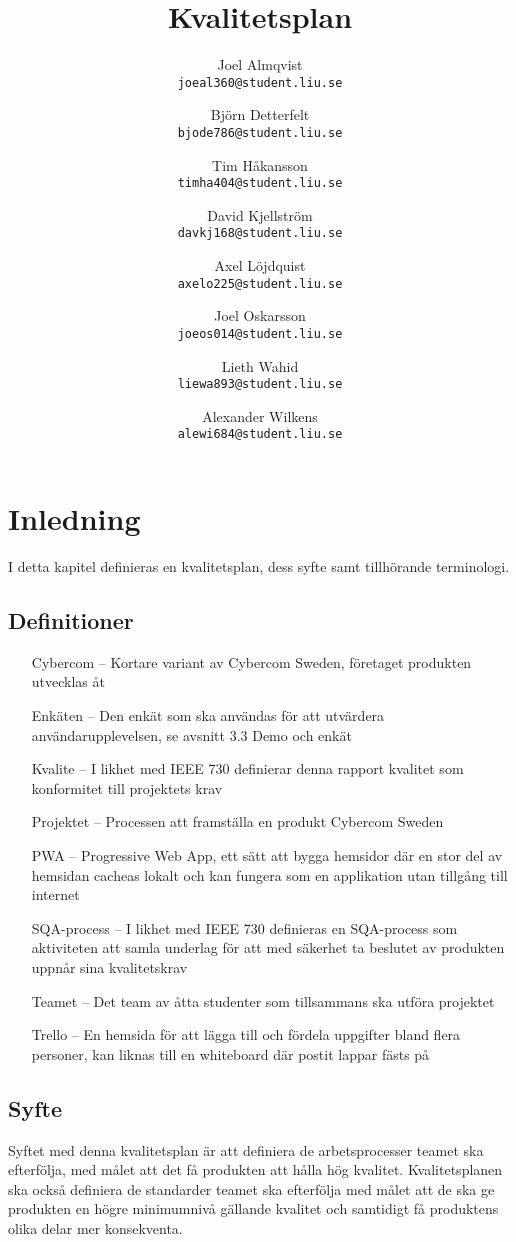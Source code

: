 \documentclass[10pt]{article}
\title{Kvalitetsplan}
\author{
    Joel Almqvist\\
    \texttt{joeal360@student.liu.se}
    \and
    Björn Detterfelt\\
    \texttt{bjode786@student.liu.se}
    \and
    Tim Håkansson\\
    \texttt{timha404@student.liu.se}
    \and
    David Kjellström\\
    \texttt{davkj168@student.liu.se}
    \and
    Axel Löjdquist\\
    \texttt{axelo225@student.liu.se}
    \and
    Joel Oskarsson\\
    \texttt{joeos014@student.liu.se}
    \and
    Lieth Wahid\\
    \texttt{liewa893@student.liu.se}
    \and
    Alexander Wilkens\\
    \texttt{alewi684@student.liu.se}
}
\begin{document}
\maketitle
\pagebreak
\tableofcontents
\pagebreak
\section{Inledning}
	I detta kapitel definieras en kvalitetsplan, dess syfte samt tillhörande terminologi.

	\subsection{Definitioner}
		\begin{itemize}
		\item [Cybercom] -- Kortare variant av Cybercom Sweden, företaget produkten utvecklas åt
		\item [Enkäten] -- Den enkät som ska användas för att utvärdera användarupplevelsen, se avsnitt  3.3 Demo och enkät
		\item [Kvalite] -- I likhet med IEEE 730 definierar denna rapport kvalitet som konformitet till projektets krav
		\item [Projektet] -- Processen att framställa en produkt  Cybercom Sweden
		\item [PWA] -- Progressive Web App, ett sätt att bygga hemsidor där en stor del av hemsidan cacheas lokalt och kan fungera som en applikation utan tillgång till internet
		\item [SQA-process] -- I likhet med IEEE 730 definieras en SQA-process som aktiviteten att samla underlag för att med säkerhet ta beslutet av produkten uppnår sina kvalitetskrav
		\item [Teamet] -- Det team av åtta studenter som tillsammans ska utföra projektet
		\item [Trello] -- En hemsida för att lägga till och fördela uppgifter bland flera personer, kan liknas till en whiteboard där postit lappar fästs på
		\end{itemize}	
	
	\subsection{Syfte}
		Syftet med denna kvalitetsplan är att definiera de arbetsprocesser teamet ska efterfölja, med målet att det få produkten att hålla hög kvalitet. Kvalitetsplanen ska också definiera de standarder teamet ska efterfölja med målet att de ska ge produkten en högre minimumnivå gällande kvalitet och samtidigt få produktens olika delar mer konsekventa.
\end{document}
